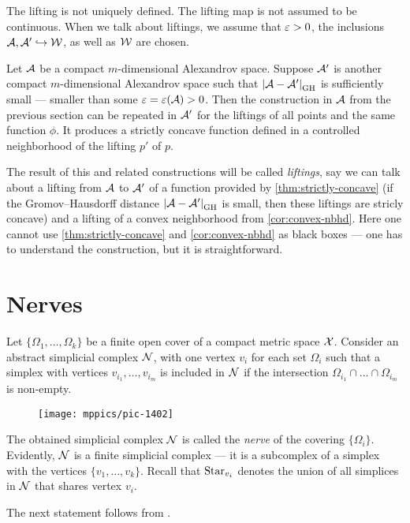 The lifting is not uniquely defined.
The lifting map is not assumed to be continuous.
When we talk about liftings, we assume that $\varepsilon>0$, the inclusions $\mathcal{A},\mathcal{A}'\hookrightarrow\mathcal{W}$,
as well as $\mathcal{W}$ are chosen.

Let $\mathcal{A}$ be  a compact $m$-dimensional Alexandrov space.
Suppose $\mathcal{A}'$ is another compact $m$-dimensional Alexandrov space such that $|{\mathcal{A}}-{\mathcal{A}'}|_{\operatorname{\rm GH}\nolimits}^{{}}$ is sufficiently small --- smaller than some $\varepsilon=\varepsilon(\mathcal{A})>0$.
Then the construction in $\mathcal{A}$ from the previous section  
can be repeated in $\mathcal{A}'$ for the liftings of all points and the same function $\phi$.
It produces a strictly concave function defined in a controlled neighborhood of the lifting $p'$ of $p$.

The result of this and related constructions will be called \emph{liftings},
say we can talk about a lifting from $\mathcal{A}$ to $\mathcal{A}'$ of a function provided by \ref{thm:strictly-concave} (if the Gromov--Hausdorff distance $|{\mathcal{A}}-{\mathcal{A}'}|_{\operatorname{\rm GH}\nolimits}^{{}}$ is small, then these liftings are stricly concave)
and a lifting of a convex neighborhood from \ref{cor:convex-nbhd}.
Here one cannot use \ref{thm:strictly-concave} and \ref{cor:convex-nbhd} as black boxes --- one has to understand the construction, but it is straightforward.

\section{Nerves}

Let $\{\Omega_1,\dots,\Omega_k\}$ be a finite open cover of a compact metric space $\mathcal{X}$.
Consider an abstract simplicial complex $\mathcal{N}$, with one vertex $v_i$ for each set $\Omega_i$ such that a simplex with vertices $v_{i_1},\dots, v_{i_m}$ is included in $\mathcal{N}$ if 
the intersection $\Omega_{i_1}\cap\dots\cap \Omega_{i_m}$ is non-empty.
\begin{figure}[ht!]
\vskip-0mm
\centering
\texttt{[image: mppics/pic-1402]}
\end{figure}
The obtained simplicial complex $\mathcal{N}$ is called the \emph{nerve} of the covering $\{\Omega_i\}$.
Evidently, $\mathcal{N}$ is a finite simplicial complex ---
it is a subcomplex of a simplex with the vertices $\{v_1,\dots,v_k\}$.
Recall that $\mathop{\rm Star}\nolimits_{v_i}$ denotes the union of all simplices in $\mathcal{N}$ that shares vertex $v_i$.

The next statement follows from \cite[4G.3]{hatcher}.


